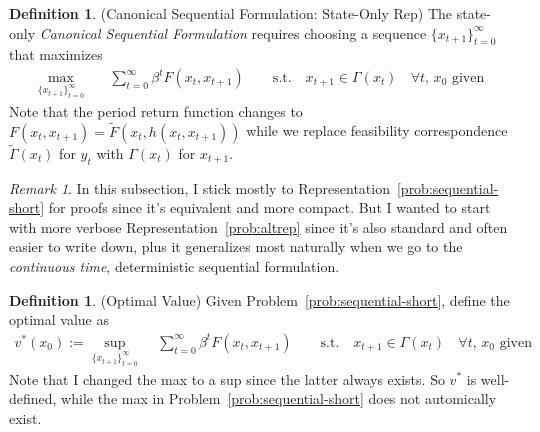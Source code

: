 \documentclass[12pt]{article}
\numberwithin{equation}{section} %
\theoremstyle{plain}
\theoremstyle{definition}
\newtheorem{defn}[thm]{Definition}
\theoremstyle{remark}
\newtheorem*{rmk}{Remark}
\newcommand{\sumtinfz}{\sum^\infty_{t=0}}
\begin{document}
\begin{defn}{(Canonical Sequential Formulation: State-Only Rep)}
The state-only \emph{Canonical Sequential Formulation} requires choosing
a sequence $\{x_{t+1}\}_{t=0}^\infty$ that maximizes
\begin{align}
  \label{prob:sequential-short}
  \max_{\{x_{t+1}\}_{t=0}^\infty}
  \quad &\sumtinfz \beta^t F(x_t,x_{t+1})
  \qquad \text{s.t.}\quad
  \text{$x_{t+1} \in \Gamma(x_t)$ $\;\forall t$, $x_0$ given}
\end{align}
Note that the period return function changes to
$F(x_t,x_{t+1})=\tilde{F}(x_t,h(x_t,x_{t+1}))$ while we replace
feasibility correspondence $\tilde{\Gamma}(x_t)$ for $y_t$ with
$\Gamma(x_t)$ for $x_{t+1}$.
\end{defn}

\begin{rmk}
In this subsection, I stick mostly to
Representation~\ref{prob:sequential-short} for proofs since it's
equivalent and more compact.
But I wanted to start with more verbose Representation~\ref{prob:altrep}
since it's also standard and often easier to write down, plus it
generalizes most naturally when we go to the \emph{continuous time},
deterministic sequential formulation.
\end{rmk}



\begin{defn}{(Optimal Value)}
\label{defn:vstar}
Given Problem~\ref{prob:sequential-short}, define the optimal value as
\begin{align}
  v^*(x_0) := \sup_{\{x_{t+1}\}_{t=0}^\infty}
  \; &\sumtinfz \beta^t F(x_t,x_{t+1})
  \qquad \text{s.t.}\quad
  \text{$x_{t+1} \in \Gamma(x_t)$ $\;\forall t$, $x_0$ given}
  \label{vstar}
\end{align}
Note that I changed the max to a sup since the latter always exists.
So $v^*$ is well-defined, while the max in
Problem~\ref{prob:sequential-short} does not automically exist.
\end{defn}
\end{document}
